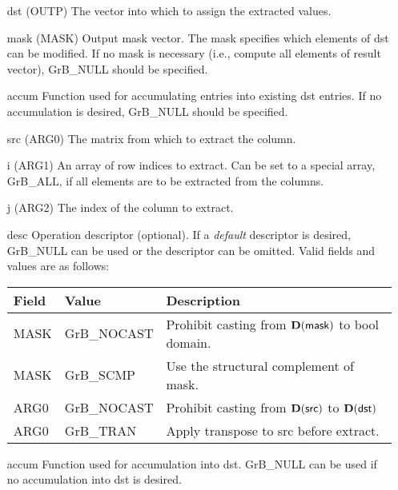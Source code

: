 \begin{itemize}[leftmargin=1in]
    \item[{\sf dst}]   ({\sf OUTP}) The vector into which to assign the extracted values.

    \item[{\sf mask}] ({\sf MASK}) Output mask vector. The mask
    specifies which elements of {\sf dst} can be modified.
    If no mask is necessary (i.e., compute all elements of result
    vector), {\sf GrB\_NULL} should be specified.

    \item[{\sf accum}]  Function used for accumulating entries into existing {\sf dst} entries. 
			If no accumulation is desired, {\sf GrB\_NULL} should be specified.

    \item[{\sf src}]   ({\sf ARG0}) The matrix from which to extract the column.

    \item[{\sf i}]     ({\sf ARG1}) An array of row indices to extract. Can
                              be set to a special array, {\sf GrB\_ALL}, if all elements
                              are to be extracted from the columns.
    \item[{\sf j}]     ({\sf ARG2}) The index of the column to extract.

    \item[{\sf desc}]   Operation descriptor (optional). If a
    \emph{default} descriptor is desired, {\sf GrB\_NULL} can be
    used or the descriptor can be omitted.  Valid fields and values are as follows: \\
    \begin{tabular}{lll}
    Field  & Value & Description \\
    \hline
    {\sf MASK} & {\sf GrB\_NOCAST} & Prohibit casting from $\bold{D}({\sf mask})$ to {\sf bool} domain. \\
    {\sf MASK} & {\sf GrB\_SCMP} & Use the structural complement of {\sf mask}. \\
    {\sf ARG0} & {\sf GrB\_NOCAST} & Prohibit casting from $\bold{D}({\sf src})$ to $\bold{D}({\sf dst})$ \\
    {\sf ARG0} & {\sf GrB\_TRAN} & Apply transpose to {\sf src} before extract. \\
    \end{tabular}

    \item[{\sf accum}] Function used for accumulation into dst.  {\sf GrB\_NULL}
                       can be used if no accumulation into dst is desired.
\end{itemize}

